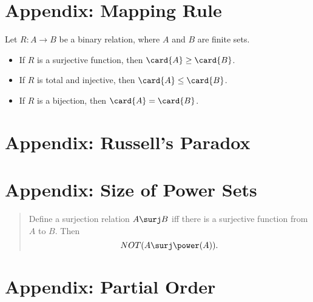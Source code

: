 \documentclass[handout]{mcs}
\begin{document}

\section*{Appendix: Mapping Rule}

Let $R: A \to B$ be a binary relation, where $A$ and $B$ are finite sets.

\begin{itemize}

\item\label{mapping-sur} If $R$ is a surjective function, then $\card{A} \geq \card{B}$.

\item\label{mapping-inj} If $R$ is total and injective, then $\card{A} \leq \card{B}$.

\item\label{mapping-bij} If $R$ is a bijection, then $\card{A} = \card{B}$.

\end{itemize}

\section*{Appendix: Russell's Paradox}


\section*{Appendix: Size of Power Sets}

\begin{quote}
  Define a surjection relation $A \surj B$ iff there is a surjective 
  function from $A$ to $B$. Then
  \[ NOT (A \surj \power(A)). \]
\end{quote}

\section*{Appendix: Partial Order}
\end{document}
